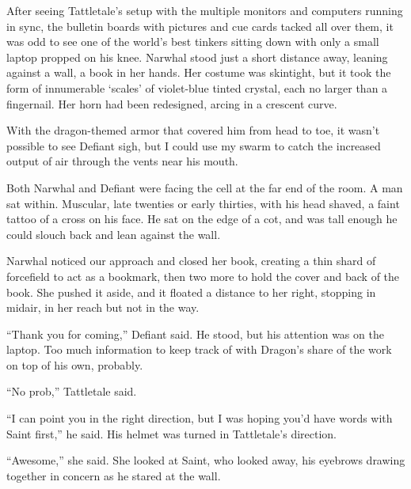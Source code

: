 





After seeing Tattletale's setup with the multiple monitors and computers running in sync, the bulletin boards with pictures and cue cards tacked all over them, it was odd to see one of the world's best tinkers sitting down with only a small laptop propped on his knee.  Narwhal stood just a short distance away, leaning against a wall, a book in her hands.  Her costume was skintight, but it took the form of innumerable `scales' of violet-blue tinted crystal, each no larger than a fingernail.  Her horn had been redesigned, arcing in a crescent curve.



With the dragon-themed armor that covered him from head to toe, it wasn't possible to see Defiant sigh, but I could use my swarm to catch the increased output of air through the vents near his mouth.



Both Narwhal and Defiant were facing the cell at the far end of the room.  A man sat within.  Muscular, late twenties or early thirties, with his head shaved, a faint tattoo of a cross on his face.  He sat on the edge of a cot, and was tall enough he could slouch back and lean against the wall.



Narwhal noticed our approach and closed her book, creating a thin shard of forcefield to act as a bookmark, then two more to hold the cover and back of the book.  She pushed it aside, and it floated a distance to her right, stopping in midair, in her reach but not in the way.



``Thank you for coming,'' Defiant said.  He stood, but his attention was on the laptop.  Too much information to keep track of with Dragon's share of the work on top of his own, probably.



``No prob,'' Tattletale said.



``I can point you in the right direction, but I was hoping you'd have words with Saint first,'' he said.  His helmet was turned in Tattletale's direction.



``Awesome,'' she said.  She looked at Saint, who looked away, his eyebrows drawing together in concern as he stared at the wall.



